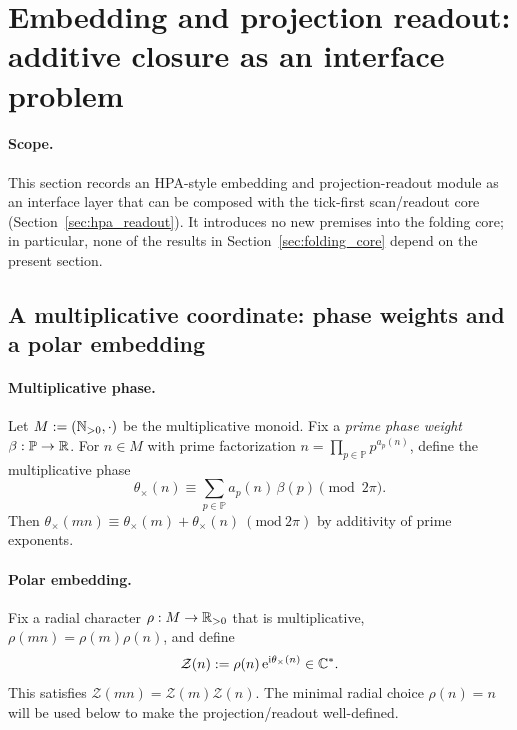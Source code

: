 \section{Embedding and projection readout: additive closure as an interface problem}
\label{sec:embedding_gap_projection}

\paragraph{Scope.}
\AuditTag This section records an HPA-style embedding and projection-readout module as an \InterfaceTag interface layer that can be composed with the tick-first scan/readout core (Section~\ref{sec:hpa_readout}).
It introduces no new premises into the folding core; in particular, none of the results in Section~\ref{sec:folding_core} depend on the present section.

\subsection{A multiplicative coordinate: phase weights and a polar embedding}
\label{subsec:hpa_embedding_polar}

\paragraph{Multiplicative phase.}
\InterfaceTag Let $M:=(\mathbb{N}_{>0},\cdot)$ be the multiplicative monoid.
Fix a \emph{prime phase weight} $\beta:\mathbb{P}\to\mathbb{R}$.
For $n\in M$ with prime factorization $n=\prod_{p\in\mathbb{P}}p^{a_p(n)}$, define the multiplicative phase
\begin{equation}
\label{eq:theta_times_def}
\theta_\times(n)\equiv \sum_{p\in\mathbb{P}} a_p(n)\,\beta(p)\pmod{2\pi}.
\end{equation}
Then $\theta_\times(mn)\equiv\theta_\times(m)+\theta_\times(n)\ (\mathrm{mod}\ 2\pi)$ by additivity of prime exponents.

\paragraph{Polar embedding.}
\InterfaceTag Fix a radial character $\rho:M\to\mathbb{R}_{>0}$ that is multiplicative, $\rho(mn)=\rho(m)\rho(n)$, and define
\begin{equation}
\label{eq:Z_embedding_def}
\mathcal{Z}(n):=\rho(n)\,\mathrm{e}^{\mathrm{i}\theta_\times(n)}\in\mathbb{C}^*.
\end{equation}
This satisfies $\mathcal{Z}(mn)=\mathcal{Z}(m)\mathcal{Z}(n)$.
The minimal radial choice $\rho(n)=n$ will be used below to make the projection/readout well-defined.

